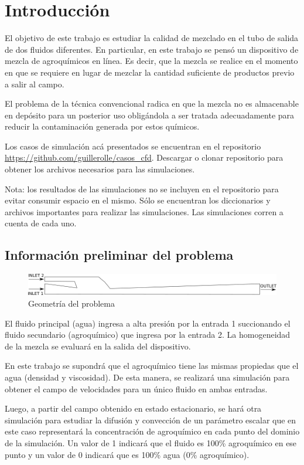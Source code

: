 \documentclass{article}
\begin{document}
\tableofcontents
\newpage

\section{Introducción}
El objetivo de este trabajo es estudiar la calidad de mezclado en el tubo de salida de dos fluidos diferentes. En particular, en este trabajo se pensó un dispositivo de mezcla de agroquímicos en línea. Es decir, que la mezcla se realice en el momento en que se requiere en lugar de mezclar la cantidad suficiente de productos previo a salir al campo. \par
El problema de la técnica convencional radica en que la mezcla no es almacenable en depósito para un posterior uso obligándola a ser tratada adecuadamente para reducir la contaminación generada por estos químicos.\par
Los casos de simulación acá presentados se encuentran en el repositorio  \href{https://github.com/guillerolle/casos_cfd}{https://github.com/guillerolle/casos\_cfd}. Descargar o clonar repositorio para obtener los archivos necesarios para las simulaciones.\par
Nota: los resultados de las simulaciones no se incluyen en el repositorio para evitar consumir espacio en el mismo. Sólo se encuentran los diccionarios y archivos importantes para realizar las simulaciones. Las simulaciones corren a cuenta de cada uno.

\subsection{Información preliminar del problema}

\begin{figure}[h!]
\centering
\includegraphics[width=1\textwidth]{Figuras/01_preliminar.png}
\caption{Geometría del problema}
\label{fig:preliminar}
\end{figure}

El fluido principal (agua) ingresa a alta presión por la entrada 1 succionando el fluido secundario (agroquímico) que ingresa por la entrada 2. La homogeneidad de la mezcla se evaluará en la salida del dispositivo.\par
\bigskip
En este trabajo se supondrá que el agroquímico tiene las mismas propiedas que el agua (densidad y viscosidad). De esta manera, se realizará una simulación para obtener el campo de velocidades para un único fluido en ambas entradas.\par
Luego, a partir del campo obtenido en estado estacionario, se hará otra simulación para estudiar la difusión y convección de un parámetro escalar que en este caso representará la concentración de agroquímico en cada punto del dominio de la simulación. Un valor de 1 indicará que el fluido es 100\% agroquímico en ese punto y un valor de 0 indicará que es 100\% agua (0\% agroquímico).
\end{document}
